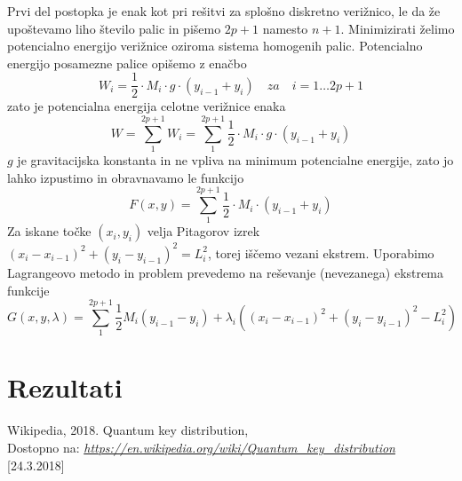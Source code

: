 \documentclass[A4paper, 11pt]{article}
\begin{document}
Prvi del postopka je enak kot pri rešitvi za splošno diskretno verižnico, le da že upoštevamo liho število palic in pišemo $2p+1$ namesto $n+1$. 
Minimizirati želimo potencialno energijo verižnice oziroma sistema homogenih palic. Potencialno energijo posamezne palice opišemo z enačbo
\[ W_i = \frac{1}{2} \cdot M_i \cdot g \cdot (y_{i-1} + y_i) \quad za \quad i=1 \ldots 2p+1 \]
zato je potencialna energija celotne verižnice enaka
\[ W = \sum_{1}^{2p+1} W_i = \sum_{1}^{2p+1} \frac{1}{2} \cdot M_i \cdot g \cdot (y_{i-1} + y_i) \]
$g$ je gravitacijska konstanta in ne vpliva na minimum potencialne energije, zato jo lahko izpustimo in obravnavamo le funkcijo
\[ F(x,y) = \sum_{1}^{2p+1} \frac{1}{2} \cdot M_i \cdot (y_{i-1} + y_i) \]
Za iskane točke $(x_i,y_i)$ velja Pitagorov izrek $(x_i - x_{i-1})^2 + (y_i - y_{i-1})^2 = L_i ^2$, torej iščemo vezani ekstrem. Uporabimo Lagrangeovo metodo in problem prevedemo na reševanje (nevezanega) ekstrema funkcije
\[ G(x,y,\lambda) = \sum_1^{2p+1} \frac{1}{2} M_i (y_{i-1} - y_i) + \lambda_i ((x_i - x_{i-1})^2 + (y_i - y_{i-1})^2 - L_i ^2) \]


\section{Rezultati} 




\begin{thebibliography}{9}
	Wikipedia, 2018. Quantum key distribution,  \\
	Dostopno na:
	\textit{\url{https://en.wikipedia.org/wiki/Quantum_key_distribution}}
	[24.3.2018]
\end{thebibliography}
\end{document}

